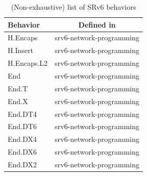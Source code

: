 \begin{table}[htbp]
\caption{(Non-exhaustive) list of SRv6 behaviors}
\label{tab:sr-behaviors}
\centering
\begin{tabular}{|l|c|}
\hline
Behavior          &  Defined in \\
\hline
H.Encaps          & srv6-network-programming \cite{id-srv6-network-prog} \\
\hline
H.Insert          & srv6-network-programming \cite{id-srv6-network-prog}  \\
\hline
H.Encaps.L2       & srv6-network-programming \cite{id-srv6-network-prog} \\
\hline
End               & srv6-network-programming \cite{id-srv6-network-prog} \\
\hline
End.T             & srv6-network-programming \cite{id-srv6-network-prog} \\
\hline
End.X             & srv6-network-programming \cite{id-srv6-network-prog} \\
\hline
End.DT4           & srv6-network-programming \cite{id-srv6-network-prog} \\
\hline
End.DT6           & srv6-network-programming \cite{id-srv6-network-prog} \\
\hline
End.DX4           & srv6-network-programming \cite{id-srv6-network-prog} \\
\hline
End.DX6           & srv6-network-programming \cite{id-srv6-network-prog} \\
\hline 
End.DX2           & srv6-network-programming \cite{id-srv6-network-prog} \\
\hline

\end{tabular}
\end{table}
